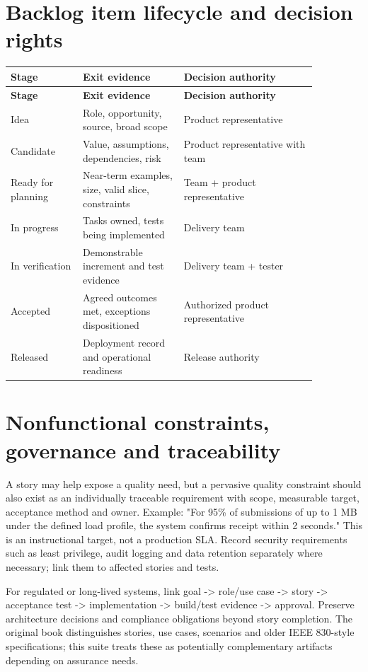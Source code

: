 \documentclass[11pt,letterpaper]{article}
\begin{document}
\section{Backlog item lifecycle and decision rights}
\begin{longtable}{|p{0.20\linewidth}|p{0.29\linewidth}|p{0.37\linewidth}|}\hline
\textbf{Stage} & \textbf{Exit evidence} & \textbf{Decision authority} \\ \hline\endfirsthead\hline
\textbf{Stage} & \textbf{Exit evidence} & \textbf{Decision authority} \\ \hline\endhead
Idea & Role, opportunity, source, broad scope & Product representative \\ \hline
Candidate & Value, assumptions, dependencies, risk & Product representative with team \\ \hline
Ready for planning & Near-term examples, size, valid slice, constraints & Team + product representative \\ \hline
In progress & Tasks owned, tests being implemented & Delivery team \\ \hline
In verification & Demonstrable increment and test evidence & Delivery team + tester \\ \hline
Accepted & Agreed outcomes met, exceptions dispositioned & Authorized product representative \\ \hline
Released & Deployment record and operational readiness & Release authority \\ \hline
\end{longtable}
\section{Nonfunctional constraints, governance and traceability}
A story may help expose a quality need, but a pervasive quality constraint should also exist as an individually traceable requirement with scope, measurable target, acceptance method and owner. Example: "For 95\% of submissions of up to 1 MB under the defined load profile, the system confirms receipt within 2 seconds." This is an instructional target, not a production SLA. Record security requirements such as least privilege, audit logging and data retention separately where necessary; link them to affected stories and tests.

For regulated or long-lived systems, link goal -> role/use case -> story -> acceptance test -> implementation -> build/test evidence -> approval. Preserve architecture decisions and compliance obligations beyond story completion. The original book distinguishes stories, use cases, scenarios and older IEEE 830-style specifications; this suite treats these as potentially complementary artifacts depending on assurance needs.
\end{document}
